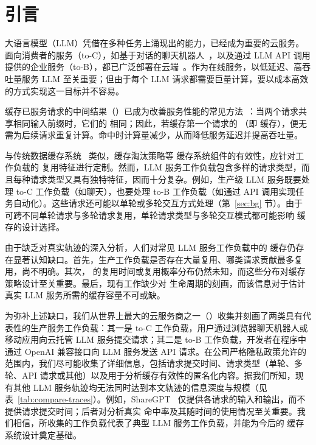 \section{引言}
\label{sec:intro}

大语言模型（LLM）凭借在多种任务上涌现出的能力，已经成为重要的云服务。面向消费者的服务（to-C），如基于对话的聊天机器人~\cite{chatgpt}，以及通过 LLM API 调用提供的企业服务（to-B），都已广泛部署在云端~\cite{openaiapi,genimiapi,claudeapi}。作为在线服务，以低延迟、高吞吐量服务 LLM 至关重要；但由于每个 LLM 请求都需要巨量计算，要以成本高效的方式实现这一目标并不容易。

缓存已服务请求的中间结果（{\kvcache}）已成为改善服务性能的常见方法~\cite{openai-cache,claude-cache}：当两个请求共享相同输入前缀时，它们的 {\kvcache} 相同；因此，若缓存第一个请求的 {\kvcache}（即 {\kvcache} 缓存），便无需为后续请求重复计算。命中时计算量减少，从而降低服务延迟并提高吞吐量。

与传统数据缓存系统~\cite{yang2020twemcache,atikoglu2012workload,180324} 类似，缓存淘汰策略等 {\kvcache} 缓存系统组件的有效性，应针对工作负载的 {\kvcache} 复用特征进行定制。然而，LLM 服务工作负载包含多样的请求类型，而且每种请求类型又具有独特特征，因而十分复杂。例如，生产级 LLM 服务既要处理 to-C 工作负载（如聊天），也要处理 to-B 工作负载（如通过 API 调用实现任务自动化）。这些请求还可能以单轮或多轮交互方式处理（第~\ref{sec:bg} 节）。由于 {\kvcache} 可跨不同单轮请求与多轮请求复用，单轮请求类型与多轮交互模式都可能影响 {\kvcache} 缓存的设计选择。

由于缺乏对真实轨迹的深入分析，人们对常见 LLM 服务工作负载中的 {\kvcache} 缓存仍存在显著认知缺口。首先，生产工作负载是否存在大量复用、哪类请求贡献最多复用，尚不明确。其次，{\kvcache} 的复用时间或复用概率分布仍然未知，而这些分布对缓存策略设计至关重要。最后，现有工作缺少对 {\kvcache} 生命周期的刻画，而该信息对于估计真实 LLM 服务所需的缓存容量不可或缺。



为弥补上述缺口，我们从世界上最大的云服务商之一（\company）收集并刻画了两类具有代表性的生产服务工作负载：其一是 to-C 工作负载，用户通过浏览器聊天机器人或移动应用向云托管 LLM 服务提交请求；其二是 to-B 工作负载，开发者在程序中通过 OpenAI 兼容接口向 LLM 服务发送 API 请求。在公司严格隐私政策允许的范围内，我们尽可能收集了详细信息，包括请求提交时间、请求类型（单轮、多轮、API 请求或其他）以及用于分析缓存有效性的匿名化内容。据我们所知，现有其他 LLM 服务轨迹均无法同时达到本文轨迹的信息深度与规模（见表~\ref{tab:compare-traces}）。例如，ShareGPT~\cite{sharegpt} 仅提供各请求的输入和输出，而不提供请求提交时间；后者对分析真实 {\kvcache} 命中率及其随时间的使用情况至关重要。我们相信，所收集的工作负载代表了典型 LLM 服务工作负载，并能为今后的 {\kvcache} 缓存系统设计奠定基础。

